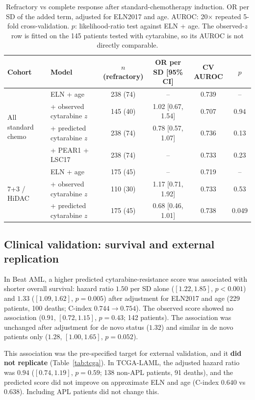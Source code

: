 \documentclass[11pt,logo,nonumbering]{preprint}
\newcommand{\z}{z}
\begin{document}
\begin{table}[ht]
\small
\centering
\caption{Refractory vs complete response after standard-chemotherapy induction. OR per SD of the added term, adjusted for ELN2017 and age. AUROC: 20$\times$ repeated 5-fold cross-validation. $p$: likelihood-ratio test against ELN + age. The observed-$\z$ row is fitted on the 145 patients tested with cytarabine, so its AUROC is not directly comparable.}
\label{tab:clinical}
\setlength{\tabcolsep}{4pt}
\begin{tabular}{@{}llcccc@{}}
\toprule
Cohort & Model & $n$ (refractory) & OR per SD [95\% CI] & CV AUROC & $p$\\
\midrule
\multirow{4}{*}{All standard chemo} & ELN + age & 238 (74) & -- & 0.739 & --\\
 & + observed cytarabine $\z$ & 145 (40) & 1.02 [0.67, 1.54] & 0.707 & 0.94\\
 & + predicted cytarabine $\z$ & 238 (74) & 0.78 [0.57, 1.07] & 0.736 & 0.13\\
 & + PEAR1 + LSC17 & 238 (74) & -- & 0.733 & 0.23\\
\midrule
\multirow{3}{*}{7+3 / HiDAC} & ELN + age & 175 (45) & -- & 0.719 & --\\
 & + observed cytarabine $\z$ & 110 (30) & 1.17 [0.71, 1.92] & 0.733 & 0.53\\
 & + predicted cytarabine $\z$ & 175 (45) & 0.68 [0.46, 1.01] & 0.738 & 0.049\\
\bottomrule
\end{tabular}
\end{table}

\subsection{Clinical validation: survival and external replication}
In Beat AML, a higher predicted cytarabine-resistance score was associated with shorter overall survival: hazard ratio $1.50$ per SD alone ($[1.22, 1.85]$, $p<0.001$) and $1.33$ ($[1.09, 1.62]$, $p=0.005$) after adjustment for ELN2017 and age (229 patients, 100 deaths; C-index $0.744\rightarrow0.754$). The observed score showed no association ($0.91$, $[0.72, 1.15]$, $p=0.43$; 142 patients). The association was unchanged after adjustment for de novo status ($1.32$) and similar in de novo patients only ($1.28$, $[1.00, 1.65]$, $p=0.052$).

This association was the pre-specified target for external validation, and it \textbf{did not replicate} (Table~\ref{tab:tcga}). In TCGA-LAML, the adjusted hazard ratio was $0.94$ ($[0.74, 1.19]$, $p=0.59$; 138 non-APL patients, 91 deaths), and the predicted score did not improve on approximate ELN and age (C-index $0.640$ vs $0.638$). Including APL patients did not change this.
\end{document}

